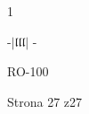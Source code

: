 \documentclass[a4paper,12pt]{article}
\begin{document}
1

-$|\mathfrak{l} \mathfrak{l} \mathfrak{l}|$ -

RO-100

Strona 27 z27
\end{document}
